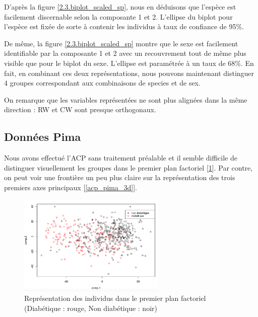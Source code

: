 \documentclass{article}
\begin{document}
D'après la figure \ref{2.3.biplot_scaled_sp}, nous en déduisons que l'espèce est facilement discernable selon la composante 1 et 2. L'ellipse du biplot pour l'espèce est fixée de sorte à contenir les individus à taux de confiance de 95\%.


De même, la figure \ref{2.3.biplot_scaled_sp} montre que le sexe est facilement identifiable par la composante 1 et 2 avec un recouvrement tout de même plus visible que pour le biplot du sexe. L'ellipse est paramétrée à un taux de 68\%. En fait, en combinant ces deux représentations, nous pouvons maintenant distinguer 4 groupes correspondant aux combinaisons de species et de sex.

On remarque que les variables représentées ne sont plus alignées dans la même direction : RW et CW sont presque orthogonaux.




\subsection{Données Pima}
Nous avons effectué l'ACP sans traitement préalable et il semble difficile de distinguer visuellement les groupes dans le premier plan factoriel [\ref{acp_pima_2d}]. Par contre, on peut voir une frontière un peu plus claire sur la représentation des trois premiers axes principaux [\ref{acp_pima_3d}].

\begin{figure}[H]
\centering
\includegraphics[width=7cm]{./img/acp_pima.png}
\caption{Représentation des individus dans le premier plan factoriel\\(Diabétique : rouge, Non diabétique : noir)}
\label{acp_pima_2d}
\end{figure}
\end{document}
